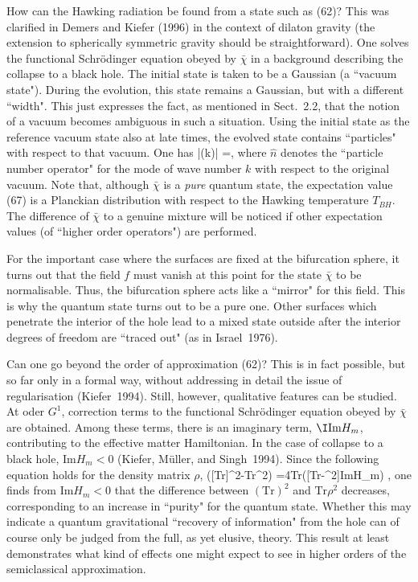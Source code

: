 How can the Hawking radiation be found from a state such as (62)?
This was clarified in Demers and Kiefer (1996) in the context
of dilaton gravity (the extension to spherically symmetric
gravity should be straightforward). One solves the functional
Schr\"odinger equation obeyed by $\bar{\chi}$ in a background
describing the collapse to a black hole. The initial state
is taken to be a Gaussian (a ``vacuum state"). During the evolution,
this state remains a Gaussian, but with a different ``width".
This just expresses the fact, as mentioned in Sect.~2.2,
that the notion of a vacuum becomes ambiguous in such a situation.
Using the initial state as the reference vacuum state also at
late times, the evolved state contains ``particles" with respect
to that vacuum. One has
\be \langle\bar{\chi}\vert{}(k)\vert\bar{\chi}\rangle
     =\enspace , \ee
where $\hat{n}$ denotes the ``particle number operator"
for the mode of wave number $k$ with respect to the
original vacuum. Note that, although $\bar{\chi}$ is a
{\em pure} quantum state, the expectation value (67) is a Planckian
distribution with respect to the Hawking temperature $T_{BH}$.
The difference of $\bar{\chi}$ to a genuine mixture will be noticed
if other expectation values (of ``higher order operators")
are performed.

For the important case where the surfaces are fixed at the
bifurcation sphere, it turns out that the field $f$ must vanish
at this point for the state $\bar{\chi}$ to be normalisable.
Thus, the bifurcation sphere acts like a ``mirror" for this field.
This is why the quantum state turns out to be a pure one.
Other surfaces which penetrate the interior of the hole
lead to a mixed state outside after the interior degrees of
freedom are ``traced out" (as in Israel~1976).

Can one go beyond the order of approximation (62)?
This is in fact possible, but so far only in a formal way,
without addressing in detail the issue of regularisation
(Kiefer~1994). Still, however, qualitative features can be studied.
At oder $G^1$, correction terms to the functional Schr\"odinger
equation obeyed by $\bar{\chi}$ are obtained. Among these terms,
there is an imaginary term, $\I\mbox{Im}H_m$, contributing
to the effective matter Hamiltonian. In the case of collapse to a
black hole, $\mbox{Im}H_m<0$ (Kiefer, M\"uller, and Singh~1994).
Since the following equation holds for the density matrix $\rho$,
\be {}\left([\mbox{Tr}\rho]^2-\mbox{Tr}\rho^2\right)
    =4\mbox{Tr}\left([\rho\mbox{Tr}\rho-\rho^2]\mbox{Im}H_m\right)
    \enspace , \ee
one finds from $\mbox{Im}H_m<0$ that the difference between
$(\mbox{Tr})^2$ and $\mbox{Tr}\rho^2$ decreases, corresponding
to an increase in ``purity" for the quantum state. 
Whether this may indicate a quantum gravitational ``recovery of
information" from the hole can of course only be judged from
the full, as yet elusive, theory. This result at least 
demonstrates what kind of effects one might expect to see
in higher orders of the semiclassical approximation.

